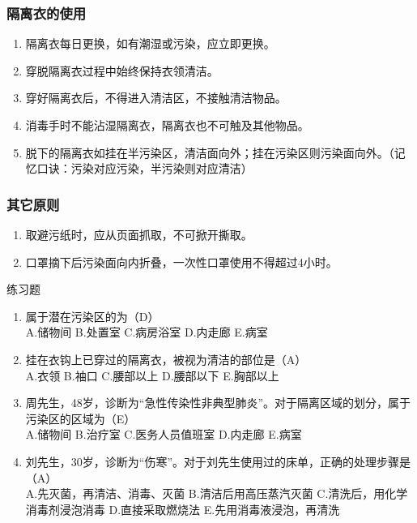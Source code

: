 \documentclass[11pt, a4paper]{ctexart}
\begin{document}
\subsubsection{隔离衣的使用}
\begin{enumerate}
    \item 隔离衣每日更换，如有潮湿或污染，应立即更换。
    \item 穿脱隔离衣过程中始终保持衣领清洁。
    \item 穿好隔离衣后，不得进入清洁区，不接触清洁物品。
    \item 消毒手时不能沾湿隔离衣，隔离衣也不可触及其他物品。
    \item 脱下的隔离衣如挂在半污染区，清洁面向外；挂在污染区则污染面向外。（记忆口诀：污染对应污染，半污染则对应清洁）
\end{enumerate}

\subsubsection{其它原则}
\begin{enumerate}
    \item 取避污纸时，应从页面抓取，不可掀开撕取。
    \item 口罩摘下后污染面向内折叠，一次性口罩使用不得超过4小时。
\end{enumerate}

\begin{examplebox}{练习题}
\begin{enumerate}
    \item 属于潜在污染区的为（D）\\
    A.储物间 \quad B.处置室 \quad C.病房浴室 \quad D.内走廊 \quad E.病室
    \item 挂在衣钩上已穿过的隔离衣，被视为清洁的部位是（A）\\
    A.衣领 \quad B.袖口 \quad C.腰部以上 \quad D.腰部以下 \quad E.胸部以上
    \item 周先生，48岁，诊断为“急性传染性非典型肺炎”。对于隔离区域的划分，属于污染区的区域为（E）\\
    A.储物间 \quad B.治疗室 \quad C.医务人员值班室 \quad D.内走廊 \quad E.病室
    \item 刘先生，30岁，诊断为“伤寒”。对于刘先生使用过的床单，正确的处理步骤是（A）\\
    A.先灭菌，再清洁、消毒、灭菌 \quad B.清洁后用高压蒸汽灭菌 \quad C.清洗后，用化学消毒剂浸泡消毒 \quad D.直接采取燃烧法 \quad E.先用消毒液浸泡，再清洗
\end{enumerate}
\end{examplebox}
\end{document}
